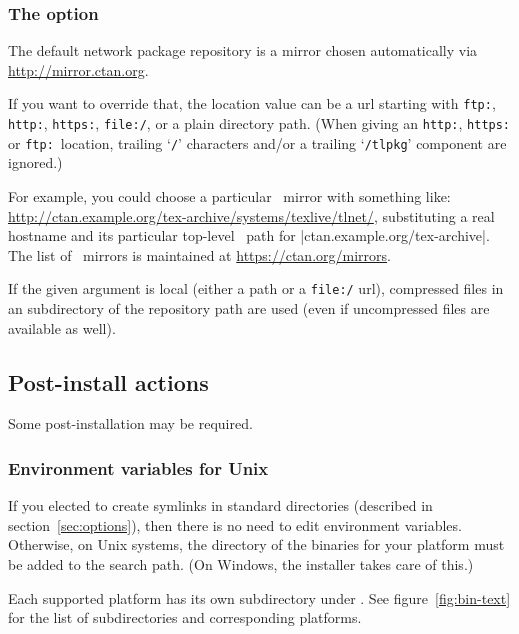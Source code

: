 \documentclass{article}
\begin{document}
\subsubsection{The  option}
\label{sec:location}

The default network package repository is a \CTAN{} mirror chosen
automatically via \url{http://mirror.ctan.org}.

If you want to override that, the location value can be a url
starting with \texttt{ftp:}, \texttt{http:}, \texttt{https:},
\texttt{file:/}, or a plain directory path.  (When giving an
\texttt{http:}, \texttt{https:} or \texttt{ftp:}\ location, trailing
`\texttt{/}' characters and/or a trailing `\texttt{/tlpkg}'
component are ignored.)

For example, you could choose a particular \CTAN\ mirror with something
like: \url{http://ctan.example.org/tex-archive/systems/texlive/tlnet/},
substituting a real hostname and its particular top-level \CTAN\ path
for |ctan.example.org/tex-archive|.  The list of \CTAN\ mirrors is
maintained at \url{https://ctan.org/mirrors}.

If the given argument is local (either a path or a \texttt{file:/} url),
compressed files in an  subdirectory of the repository
path are used (even if uncompressed files are available as well).

\subsection{Post-install actions}
\label{sec:postinstall}

Some post-installation may be required.

\subsubsection{Environment variables for Unix}
\label{sec:env}

If you elected to create symlinks in standard directories (described in
section~\ref{sec:options}), then there is no need to edit environment
variables.  Otherwise, on Unix systems, the directory of the binaries
for your platform must be added to the search path.  (On Windows, the
installer takes care of this.)

Each supported platform has its own subdirectory under
. See figure~\ref{fig:bin-text} for the list of
subdirectories and corresponding platforms.
\end{document}
